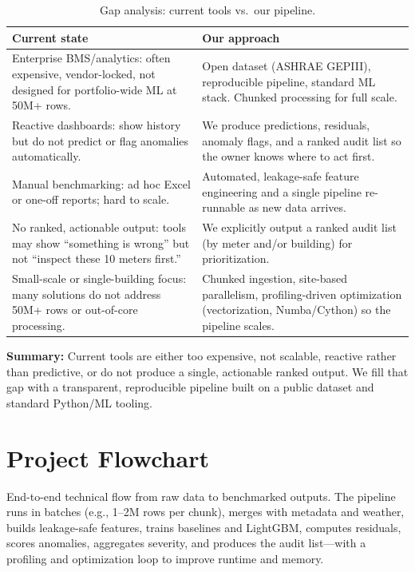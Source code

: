 \documentclass[11pt,a4paper]{article}
\begin{document}
\begin{table}[htbp]
\centering
\small
\begin{tabular}{@{}p{4.2cm}p{7.5cm}@{}}
\toprule
\textbf{Current state} & \textbf{Our approach} \\
\midrule
Enterprise BMS/analytics: often expensive, vendor-locked, not designed for portfolio-wide ML at 50M+ rows. & Open dataset (ASHRAE GEPIII), reproducible pipeline, standard ML stack. Chunked processing for full scale. \\
Reactive dashboards: show history but do not predict or flag anomalies automatically. & We produce predictions, residuals, anomaly flags, and a ranked audit list so the owner knows where to act first. \\
Manual benchmarking: ad hoc Excel or one-off reports; hard to scale. & Automated, leakage-safe feature engineering and a single pipeline re-runnable as new data arrives. \\
No ranked, actionable output: tools may show ``something is wrong'' but not ``inspect these 10 meters first.'' & We explicitly output a ranked audit list (by meter and/or building) for prioritization. \\
Small-scale or single-building focus: many solutions do not address 50M+ rows or out-of-core processing. & Chunked ingestion, site-based parallelism, profiling-driven optimization (vectorization, Numba/Cython) so the pipeline scales. \\
\bottomrule
\end{tabular}
\caption{Gap analysis: current tools vs.\ our pipeline.}
\end{table}

\noindent\textbf{Summary:} Current tools are either too expensive, not scalable, reactive rather than predictive, or do not produce a single, actionable ranked output. We fill that gap with a transparent, reproducible pipeline built on a public dataset and standard Python/ML tooling.

\section{Project Flowchart}

End-to-end technical flow from raw data to benchmarked outputs. The pipeline runs in batches (e.g., 1--2M rows per chunk), merges with metadata and weather, builds leakage-safe features, trains baselines and LightGBM, computes residuals, scores anomalies, aggregates severity, and produces the audit list---with a profiling and optimization loop to improve runtime and memory.
\end{document}
